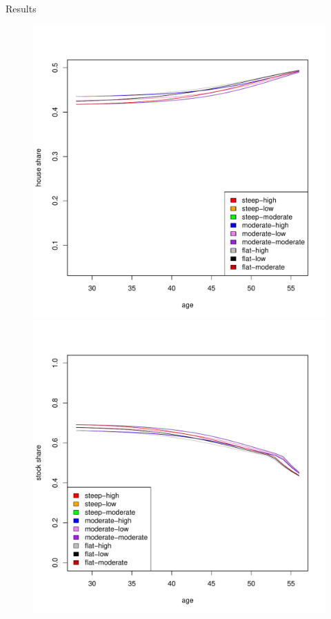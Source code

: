 \documentclass{beamer}
\begin{document}
\begin{frame}[allowframebreaks]{Results}
\begin{itemize}
\begin{figure}[H]
		\includegraphics[scale=0.25]{figs/hmunkhouse15.pdf}
		\includegraphics[scale=0.25]{figs/smunkhouse3.pdf}

\end{figure}
\end{itemize}
\end{frame}
\end{document}
